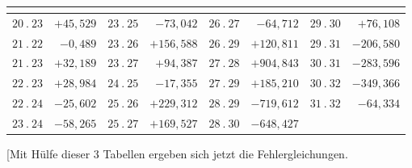 \par\medskip
{\centering
\setlength{\tabcolsep}{.24em}
\begin{tabular}{|c|r||c|r||c|r||c|r|}
&&
&&
&&
&\\[2pt]
\hline
\(20\ .\ 23\) & \(+45{,}529\) & \(23\ .\ 25\) & \(-73{,}042\) & \(26\ .\ 27\) & \(-64{,}712\) & \(29\ .\ 30\) & \(+76{,}108\)\\
\(21\ .\ 22\) & \(-0{,}489\) & \(23\ .\ 26\) & \(+156{,}588\) & \(26\ .\ 29\) & \(+120{,}811\) & \(29\ .\ 31\) & \(-206{,}580\)\\
\(21\ .\ 23\) & \(+32{,}189\) & \(23\ .\ 27\) & \(+94{,}387\) & \(27\ .\ 28\) & \(+904{,}843\) & \(30\ .\ 31\) & \(-283{,}596\)\\
\(22\ .\ 23\) & \(+28{,}984\) & \(24\ .\ 25\) & \(-17{,}355\) & \(27\ .\ 29\) & \(+185{,}210\) & \(30\ .\ 32\) & \(-349{,}366\)\\
\(22\ .\ 24\) & \(-25{,}602\) & \(25\ .\ 26\) & \(+229{,}312\) & \(28\ .\ 29\) & \(-719{,}612\) & \(31\ .\ 32\) & \(-64{,}334\)\\
\(23\ .\ 24\) & \(-58{,}265\) & \(25\ .\ 27\) & \(+169{,}527\) & \(28\ .\ 30\) & \(-648{,}427\) &  & \\
\end{tabular}\par}
\par\medskip
\par\noindent\hspace*{\parindent}[Mit Hülfe dieser 3 Tabellen ergeben sich jetzt die Fehlergleichungen.
